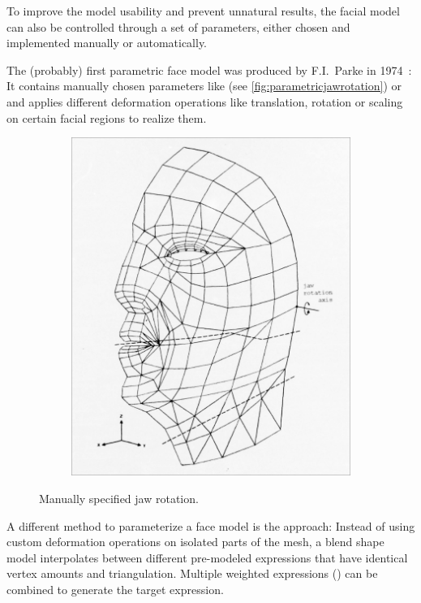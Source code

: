To improve the model usability and prevent unnatural results,
the facial model can also be controlled through a set of parameters,
either chosen and implemented manually or automatically.

The (probably) first parametric face model was produced by F.I.\ Parke in 1974~\autocite{parametricface}:
It contains manually chosen parameters like  (see \autoref{fig:parametricjawrotation}) or  and applies different deformation operations like translation,
rotation or scaling on certain facial regions to realize them.

\begin{figure}[h]
  \centering
  \begin{subfigure}[b]{0.3\textwidth}
	\includegraphics[scale=0.2]{img/parametric_model.png}
  \end{subfigure}
  \caption{Manually specified jaw rotation.~\autocite{parametricface}}
  \label{fig:parametricjawrotation}
\end{figure}

A different method to parameterize a face model is the  approach:
Instead of using custom deformation operations on isolated parts of the mesh,
a blend shape model interpolates between different pre-modeled expressions that have identical vertex amounts and triangulation.
Multiple weighted expressions () can be combined to generate the target expression.

